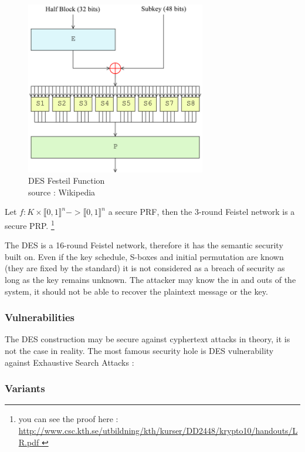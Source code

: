 \begin{figure}[ht!]
    \centering
       \includegraphics[width=0.7\textwidth]{images/DES-f-function.png}
    \caption{DES Festeil Function \\ source : Wikipedia}
	\label{fig:DES-f-function}
\end{figure}


\begin{mytheorem}
    Let $f:K\times\llbracket0,1\rrbracket^n -> \llbracket0,1\rrbracket^n$ a secure PRF, then the 3-round Feistel network is a secure PRP. \footnote{ you can see the proof here : \url{http://www.csc.kth.se/utbildning/kth/kurser/DD2448/krypto10/handouts/LR.pdf }}
\end{mytheorem}

The DES is a 16-round Feistel network, therefore it has the semantic security built on.  Even if the key schedule, S-boxes and initial permutation are known (they are fixed by the standard) it is not considered as a breach of security as long as the key remains unknown. The attacker may know the in and outs of the system, it should not be able to recover the plaintext message or the key.

\subsubsection{ Vulnerabilities }

The DES construction may be secure against cyphertext attacks in theory, it is not the case in reality. The most famous security hole is DES vulnerability against Exhaustive Search Attacks : 	

\subsubsection{Variants}

